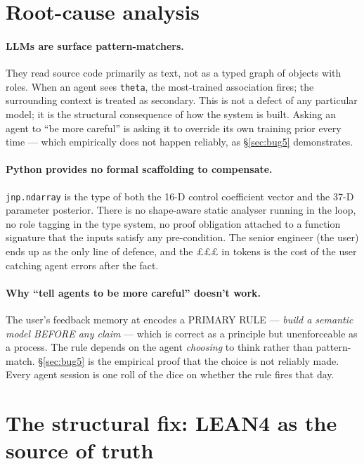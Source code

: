 \documentclass[11pt,a4paper]{article}
\begin{document}
\section{Root-cause analysis}
\label{sec:rca}

\paragraph{LLMs are surface pattern-matchers.} They read source
code primarily as text, not as a typed graph of objects with
roles. When an agent sees \texttt{theta}, the most-trained
association fires; the surrounding context is treated as
secondary. This is not a defect of any particular model; it is the
structural consequence of how the system is built. Asking an agent
to ``be more careful'' is asking it to override its own training
prior every time --- which empirically does not happen reliably,
as §\ref{sec:bug5} demonstrates.

\paragraph{Python provides no formal scaffolding to compensate.}
\texttt{jnp.ndarray} is the type of both the 16-D control
coefficient vector and the 37-D parameter posterior. There is no
shape-aware static analyser running in the loop, no role tagging
in the type system, no proof obligation attached to a function
signature that the inputs satisfy any pre-condition. The senior
engineer (the user) ends up as the only line of defence, and the
£££ in tokens is the cost of the user catching agent errors after
the fact.

\paragraph{Why ``tell agents to be more careful'' doesn't work.}
The user's feedback memory at 
encodes a PRIMARY RULE --- \emph{build a semantic model BEFORE any
claim} --- which is correct as a principle but unenforceable as a
process. The rule depends on the agent \emph{choosing} to think
rather than pattern-match. §\ref{sec:bug5} is the empirical proof
that the choice is not reliably made. Every agent session is one
roll of the dice on whether the rule fires that day.

\section{The structural fix: LEAN4 as the source of truth}
\label{sec:fix}
\end{document}
